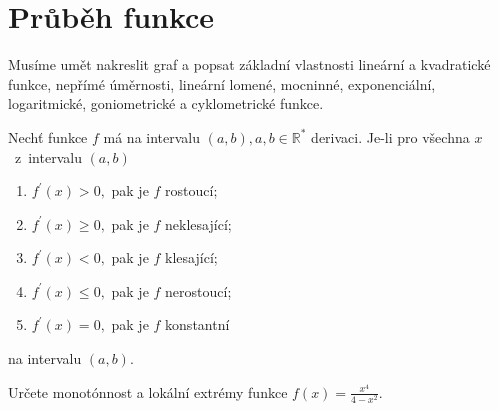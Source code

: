 \section{Průběh funkce}
\begin{pozn}
    Musíme umět nakreslit graf a popsat základní vlastnosti lineární a
    kvadratické funkce, nepřímé úměrnosti, lineární lomené, mocninné, exponenciální,
    logaritmické, goniometrické a cyklometrické funkce.
\end{pozn}

\begin{veta}
Nechť funkce $f$ má na intervalu $(a,b),a,b\in \mathbb R^*$ derivaci. Je-li pro
všechna $x$~z~intervalu $(a,b)$
\begin{enumerate}[$i.$]
\item $f^\prime(x)>0,$ pak je $f$ rostoucí;
\item $f^\prime(x)\geq 0,$ pak je $f$ neklesající;
\item $f^\prime(x)<0,$ pak je $f$ klesající;
\item $f^\prime(x) \leq 0,$ pak je $f$ nerostoucí;
\item $f^\prime(x)=0,$ pak je $f$ konstantní
\end{enumerate}
na intervalu $(a,b).$
\end{veta}

\begin{priklad}
Určete monotónnost a lokální extrémy funkce $f(x)=\frac{x^4}{4-x^2}$.
\end{priklad}

